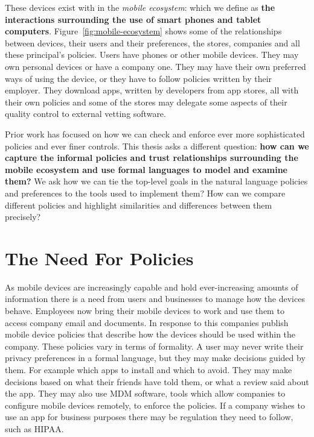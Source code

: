 \documentclass[thesis.tex]{subfiles}
\begin{document}
These devices exist with in the \emph{mobile ecosystem}: which we define as
\textbf{the interactions surrounding the use of smart phones and tablet
computers}. Figure~\ref{fig:mobile-ecosystem} shows some of the relationships
between devices, their users and their preferences, the stores, companies and
all these principal's policies. Users have phones or other mobile devices. They
may own personal devices or have a company one. They may have their own
preferred ways of using the device, or they have to follow policies written
by their employer. They download apps, written by developers from app stores,
all with their own policies and some of the stores may delegate some aspects of
their quality control to external vetting software.

Prior work has focused on how we can check and enforce ever more sophisticated
policies and ever finer controls. This thesis asks a different question:
\textbf{how can we capture the informal policies and trust relationships
surrounding the mobile ecosystem and use formal languages to model and examine
them?} We ask how we can tie the top-level goals in the natural language
policies and preferences to the tools used to implement them? How can we compare
different policies and highlight similarities and differences between them
precisely?

\section{The Need For Policies}

As mobile devices are increasingly capable and hold ever-increasing amounts of
information there is a need from users and businesses to manage how the devices
behave. Employees now bring their mobile devices to work and use them to access
company email and documents. In response to this companies publish mobile device
policies that describe how the devices should be used within the company. These
policies vary in terms of formality. A user may never write their privacy
preferences in a formal language, but they may make decisions guided by them.
For example which apps to install and which to avoid. They may make decisions
based on what their friends have told them, or what a review said about the app.
They may also use \ac{MDM} software, tools which allow companies to configure
mobile devices remotely, to enforce the policies. If a company wishes to use an
app for business purposes there may be regulation they need to follow, such as
\ac{HIPAA}.
\end{document}
